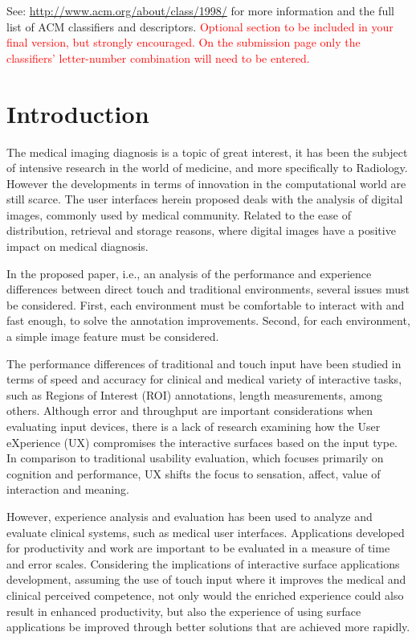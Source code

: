 \documentclass{sigchi}
\begin{document}
See: \url{http://www.acm.org/about/class/1998/}
for more information and the full list of ACM classifiers
and descriptors. \newline
\textcolor{red}{Optional section to be included in your final version, 
but strongly encouraged. On the submission page only the classifiers’ 
letter-number combination will need to be entered.}

\section{Introduction}

The medical imaging diagnosis is a topic of great interest, it has been the subject of intensive research \cite{doi2007computer, seibel2005medical, doi2005current} in the world of medicine, and more specifically to Radiology. However the developments in terms of innovation in the computational world are still scarce. The user interfaces herein proposed deals with the analysis of digital images, commonly used by medical community. Related to the ease of distribution, retrieval and storage reasons, where digital images have a positive impact on medical diagnosis.

In the proposed paper, i.e., an analysis of the performance and experience differences between direct touch and traditional environments, several issues must be considered. First, each environment must be comfortable to interact with and fast enough, to solve the annotation improvements. Second, for each environment, a simple image feature must be considered.

The performance differences of traditional and touch input have been studied in terms of speed and accuracy for clinical and medical variety of interactive tasks, such as Regions of Interest (ROI) annotations, length measurements, among others. Although error and throughput are important considerations when evaluating input devices, there is a lack of research examining how the User eXperience (UX) compromises the interactive surfaces based on the input type. In comparison to traditional usability evaluation, which focuses primarily on cognition and performance, UX shifts the focus to sensation, affect, value of interaction and meaning.

However, experience analysis and evaluation has been used to analyze and evaluate clinical systems, such as \cite{crisan2013optimization} medical user interfaces. Applications developed for productivity and work are important to be evaluated in a measure of time and error scales. Considering the implications of interactive surface applications development, assuming the use of touch input where it improves the medical and clinical perceived competence, not only would the enriched experience could also result in enhanced productivity, but also the experience of using surface applications be improved through better solutions that are achieved more rapidly.
\end{document}
